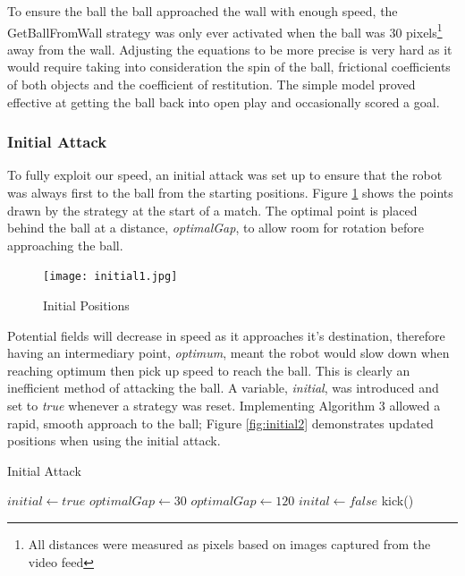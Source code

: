 To ensure the ball the ball approached the wall with enough speed, the GetBallFromWall strategy was only ever activated when the ball was 30 pixels\footnote{All distances were measured as pixels based on images captured from the video feed} away from the wall. Adjusting the equations to be more precise is very hard as it would require taking into consideration the spin of the ball, frictional coefficients of both objects and the coefficient of restitution. The simple model proved effective at getting the ball back into open play and occasionally scored a goal.\linebreak

\subsubsection{Initial Attack}
To fully exploit our speed, an initial attack was set up to ensure that the robot was always first to the ball from the starting positions. Figure \ref{fig:initial1} shows the points drawn by the strategy at the start of a match. The optimal point is placed behind the ball at a distance, \textit{optimalGap}, to allow room for rotation before approaching the ball.

\begin{figure}[htp]
\begin{center}
\leavevmode
\texttt{[image: initial1.jpg]}
\end{center}
\caption{Initial Positions}
\label{fig:initial1}
\end{figure}

Potential fields will decrease in speed as it approaches it's destination, therefore having an intermediary point, \textit{optimum}, meant the robot would slow down when reaching optimum then pick up speed to reach the ball. This is clearly an inefficient method of attacking the ball. A variable, \textit{initial}, was introduced and set to \textit{true} whenever a strategy was reset. Implementing Algorithm 3 allowed a rapid, smooth approach to the ball; Figure \ref{fig:initial2} demonstrates updated positions when using the initial attack. \linebreak

\begin{algorithm}
\caption{Initial Attack}
\begin{algorithmic}[1]
\STATE $initial\gets true$
			\STATE $optimalGap\gets 30$
		\ELSE
			\STATE $optimalGap\gets 120$
			\STATE $inital\gets false$
			\STATE kick()
		\ENDIF
	\ENDIF
\ENDWHILE
\end{algorithmic}
\end{algorithm}

